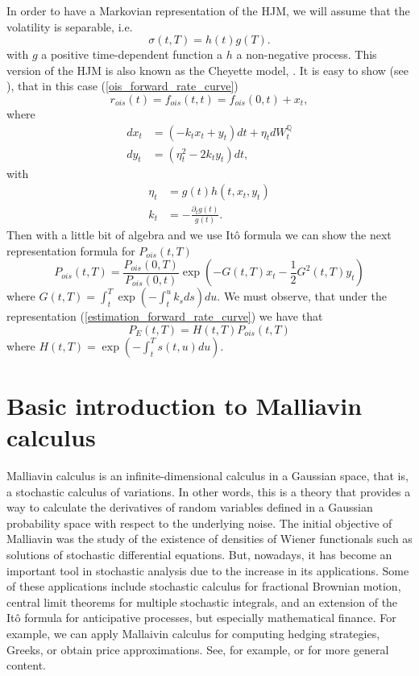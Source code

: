 \documentclass[a4paper,10pt]{article}
\newcommand{\1}{\mathbf{1}}
\begin{document}
In order to have a Markovian representation of the HJM, we will assume that the volatility is separable, i.e.
\begin{equation}
\sigma(t,T)= h(t)g(T).
\end{equation}
with $g$ a positive time-dependent function a $h$ a non-negative process. This version of the HJM is also known as the Cheyette model, \cite{Cheyette}. It is easy to show (see \cite{Andreasen01}), that in this case (\ref{ois_forward_rate_curve})
\begin{equation}
r_{ois}(t)=f_{ois}(t,t)= f_{ois}(0,t) + x_t,
\end{equation}  
where
\begin{align}\label{short_rate_cheyette}
dx_t &= (-k_t x_t + y_t)dt + \eta_t dW_t^{\mathbb{Q}} \nonumber \\
dy_t &= (\eta^{2}_t - 2 k_t y_t) dt ,
\end{align} 
with 
\begin{align*}
\eta_t &= g(t)h(t,x_t,y_t)  \nonumber \\
k_t &= - \frac{\partial_t g(t)}{g(t)}.
\end{align*}
Then with a little bit of algebra and we use Itô formula we can show the next representation formula for $P_{ois}(t,T)$
\begin{equation}\label{bond_ois}
P_{ois}(t,T) = \frac{P_{ois}(0,T)}{P_{ois}(0,t)} \exp\left(-G(t,T)x_t - \frac{1}{2} G^{2}(t,T)y_t \right)
\end{equation}
where $G(t,T) = \int_{t}^{T} \exp\left(-\int_{t}^{u} k_s ds \right) du$. We must observe, that under the representation (\ref{estimation_forward_rate_curve}) we have that
\begin{equation}\label{bond_forward}
P_{E}(t,T)=H(t,T)P_{ois}(t,T)
\end{equation}
where $H(t,T)=\exp\left(-\int_{t}^{T}s(t,u) du \right)$.

\section{Basic introduction to Malliavin calculus}\label{sec:Malliavin}
Malliavin calculus is an infinite-dimensional calculus in a Gaussian space, that is, a stochastic calculus of variations. In other words, this is a theory that provides a way to calculate the derivatives of random variables defined in a Gaussian probability space with respect to the underlying noise. The initial objective of Malliavin was the study of the existence of densities of Wiener functionals such as solutions of stochastic differential equations. But, nowadays, it has become an important tool in stochastic analysis due to the increase in its applications. Some of these applications include stochastic calculus for fractional Brownian motion, central limit theorems for multiple stochastic integrals, and an extension of the Itô formula for anticipative processes, but especially mathematical finance. For example, we can apply Mallaivin calculus for computing hedging strategies, Greeks, or obtain price approximations. See, for example, \cite{AlosLorite} or \cite{Nualart} for more general content.\\
\end{document}
